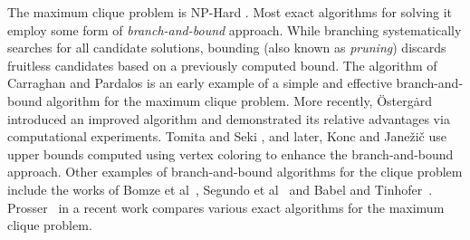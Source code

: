 The maximum clique problem is NP-Hard \cite{Garey:1979:CIG:578533}.
Most exact algorithms for solving it employ some form of {\it branch-and-bound} approach. 
While branching systematically searches for all candidate solutions, bounding (also known as {\em pruning}) discards fruitless candidates based on a previously computed bound. 
The algorithm of Carraghan and Pardalos \cite{pardalos} is an early example of 
a simple and  effective branch-and-bound algorithm for the maximum clique problem.
More recently,  \"{O}sterg\.{a}rd \cite{ostergard} introduced 
an improved algorithm and demonstrated its relative advantages via computational experiments. 
Tomita and Seki \cite{citeulike:7905505}, and later, Konc and Jane\v{z}i\v{c} \cite{konc2007improved}
use upper bounds computed using vertex coloring to enhance the branch-and-bound approach. 
Other examples of branch-and-bound algorithms for the clique problem include 
the works of Bomze et al~\cite{Bomze99themaximum}, Segundo et al~\cite{SanSegundo}
and Babel and Tinhofer~\cite{babel1990branch}.
Prosser~\cite{prosser2012} in a recent work compares various exact algorithms 
for the maximum clique problem. %


